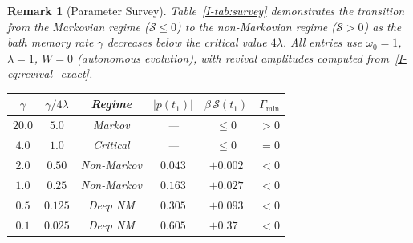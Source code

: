 \documentclass[12pt,a4paper,openany]{book}
\newtheorem{remark}[theorem]{Remark}
\begin{document}
\begin{remark}[Parameter Survey]
\label{I-rem:parameter_survey}
Table~\ref{I-tab:survey} demonstrates the transition from
the Markovian regime ($\mathcal{S} \leq 0$) to the
non-Markovian regime ($\mathcal{S} > 0$) as the bath
memory rate $\gamma$ decreases below the critical value
$4\lambda$.
All entries use $\omega_0 = 1$, $\lambda = 1$,
$W = 0$ (autonomous evolution), with revival amplitudes
computed from~\eqref{I-eq:revival_exact}.
\begin{center}
\begin{tabular}{@{}cccccc@{}}
\toprule
$\gamma$ & $\gamma/4\lambda$ & Regime
& $|p(t_1)|$ & $\beta\,\mathcal{S}(t_1)$
& $\Gamma_{\min}$ \\
\midrule
$20.0$ & $5.0$ & Markov & --- & $\leq 0$ & $>0$ \\
$4.0$ & $1.0$ & Critical & --- & $\leq 0$ & $= 0$ \\
$2.0$ & $0.50$ & Non-Markov & $0.043$
  & $+0.002$ & $< 0$ \\
$1.0$ & $0.25$ & Non-Markov & $0.163$
  & $+0.027$ & $< 0$ \\
$0.5$ & $0.125$ & Deep NM & $0.305$
  & $+0.093$ & $< 0$ \\
$0.1$ & $0.025$ & Deep NM & $0.605$
  & $+0.37\phantom{0}$ & $< 0$ \\
\bottomrule
\end{tabular}
\end{center}
\captionsetup{hypcap=false}%
\label{I-tab:survey}
\end{remark}
\end{document}
